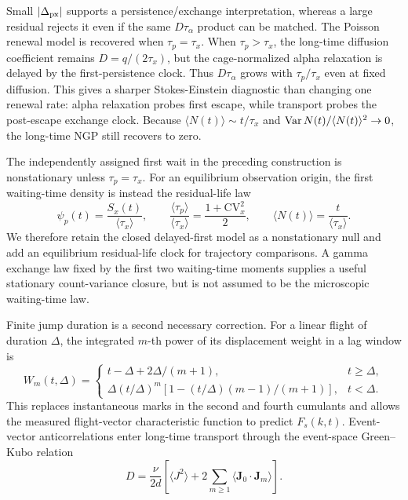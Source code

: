 \documentclass[aps,preprint,onecolumn,superscriptaddress,nofootinbib]{revtex4-2}
\begin{document}
Small $|\Delta_{\rm px}|$ supports a persistence/exchange interpretation,
whereas a large residual rejects it even if the same $D\tau_\alpha$ product can
be matched.
The Poisson renewal model is recovered when $\tau_p=\tau_x$. When
$\tau_p>\tau_x$, the long-time diffusion coefficient remains
$D=q/(2\tau_x)$, but the cage-normalized alpha relaxation is delayed by the
first-persistence clock. Thus $D\tau_\alpha$ grows with $\tau_p/\tau_x$ even at
fixed diffusion. This gives a sharper Stokes-Einstein diagnostic than changing
one renewal rate: alpha relaxation probes first escape, while transport probes
the post-escape exchange clock. Because $\langle N(t)\rangle\sim t/\tau_x$ and
${\rm Var}\,N(t)/\langle N(t)\rangle^2\to0$, the long-time NGP still recovers
to zero.

The independently assigned first wait in the preceding construction is
nonstationary unless $\tau_p=\tau_x$.  For an equilibrium observation origin,
the first waiting-time density is instead the residual-life law
\begin{equation}
  \psi_p(t)=\frac{S_x(t)}{\langle\tau_x\rangle},\qquad
  \frac{\langle\tau_p\rangle}{\langle\tau_x\rangle}
  =\frac{1+\mathrm{CV}_x^2}{2},\qquad
  \langle N(t)\rangle=\frac{t}{\langle\tau_x\rangle}.
\end{equation}
We therefore retain the closed delayed-first model as a nonstationary null and
add an equilibrium residual-life clock for trajectory comparisons.  A gamma
exchange law fixed by the first two waiting-time moments supplies a useful
stationary count-variance closure, but is not assumed to be the microscopic
waiting-time law.

Finite jump duration is a second necessary correction.  For a linear flight of
duration $\Delta$, the integrated $m$-th power of its displacement weight in
a lag window is
\begin{equation}
 W_m(t,\Delta)=
 \begin{cases}
 t-\Delta+2\Delta/(m+1),&t\ge\Delta,\\
 \Delta(t/\Delta)^m[1-(t/\Delta)(m-1)/(m+1)],&t<\Delta.
 \end{cases}
\end{equation}
This replaces instantaneous marks in the second and fourth cumulants and
allows the measured flight-vector characteristic function to predict
$F_s(k,t)$.  Event-vector anticorrelations enter long-time transport through
the event-space Green--Kubo relation
\begin{equation}
 D=\frac{\nu}{2d}\left[\langle J^2\rangle
 +2\sum_{m\ge1}\langle\mathbf J_0\!\cdot\!\mathbf J_m\rangle\right].
\end{equation}
\end{document}
